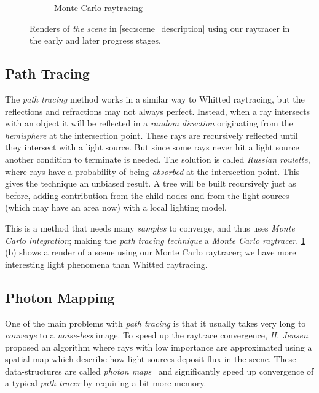 \documentclass[a4paper, twocolumn]{article}
\begin{document}
\begin{figure}[ht]
\begin{subfigure}{0.48\linewidth}
            \caption{Monte Carlo raytracing}
        \end{subfigure}
        \caption{Renders of \emph{the scene} in \cref{sec:scene_description} using our raytracer in the early and later progress stages.}
        \label{fig:raytracing}
    \end{figure}

    \vspace{-1.5em}

    \subsection{Path Tracing} \label{sec:path_tracing}

    The \emph{path tracing} method works in a similar way to Whitted raytracing, but the reflections and refractions may not always perfect. Instead, when a ray intersects with an object it will be reflected in a \emph{random direction} originating from the \emph{hemisphere} at the intersection point. These rays are recursively reflected until they intersect with a light source. But since some rays never hit a light source another condition to terminate is needed. The solution is called \emph{Russian roulette}, where rays have a probability of being \emph{absorbed} at the intersection point. This gives the technique an unbiased result. A tree will be built recursively just as before, adding contribution from the child nodes and from the light sources (which may have an area now) with a local lighting model.

    This is a method that needs many \emph{samples} to converge, and thus uses \emph{Monte Carlo integration}; making the \emph{path tracing technique} a \emph{Monte Carlo raytracer}. \cref{fig:raytracing} (b) shows a render of a scene using our Monte Carlo raytracer; we have more interesting light phenomena than Whitted raytracing.

    \subsection{Photon Mapping} \label{sec:photon_mapping}

    One of the main problems with \textit{path tracing} is that it usually takes very long to \emph{converge} to a \emph{noise-less} image. To speed up the raytrace convergence, \emph{H. Jensen} proposed an algorithm where rays with low importance are approximated using a spatial map which describe how light sources deposit flux in the scene. These data-structures are called \textit{photon maps}~\cite{jensen1996global} and significantly speed up convergence of a typical \textit{path tracer} by requiring a bit more memory.
\end{document}
